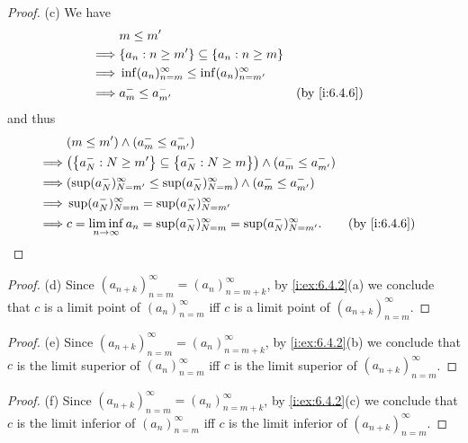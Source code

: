 \begin{proof}{(c)}
  We have
  \begin{align*}
             & m \leq m'                                                                 \\
    \implies & \set{a_n : n \geq m'} \subseteq \set{a_n : n \geq m}                      \\
    \implies & \inf(a_n)_{n = m}^\infty \leq \inf(a_n)_{n = m'}^\infty                   \\
    \implies & a_m^- \leq a_{m'}^-                                     &  & \by{i:6.4.6}
  \end{align*}
  and thus
  \begin{align*}
             & (m \leq m') \land (a_m^- \leq a_{m'}^-)                                                                          \\
    \implies & \big(\set{a_N^- : N \geq m'} \subseteq \set{a_N^- : N \geq m}\big) \land (a_m^- \leq a_{m'}^-)                   \\
    \implies & (\sup(a_N^-)_{N = m'}^\infty \leq \sup(a_N^-)_{N = m}^\infty) \land (a_m^- \leq a_{m'}^-)                        \\
    \implies & \sup(a_N^-)_{N = m}^\infty = \sup(a_N^-)_{N = m'}^\infty                                                         \\
    \implies & c = \liminf_{n \to \infty} a_n = \sup(a_N^-)_{N = m}^\infty = \sup(a_N^-)_{N = m'}^\infty.     &  & \by{i:6.4.6}
  \end{align*}
\end{proof}

\begin{proof}{(d)}
  Since \((a_{n + k})_{n = m}^\infty = (a_n)_{n = m + k}^\infty\), by \cref{i:ex:6.4.2}(a) we conclude that \(c\) is a limit point of \((a_n)_{n = m}^\infty\) iff \(c\) is a limit point of \((a_{n + k})_{n = m}^\infty\).
\end{proof}

\begin{proof}{(e)}
  Since \((a_{n + k})_{n = m}^\infty = (a_n)_{n = m + k}^\infty\), by \cref{i:ex:6.4.2}(b) we conclude that \(c\) is the limit superior of \((a_n)_{n = m}^\infty\) iff \(c\) is the limit superior of \((a_{n + k})_{n = m}^\infty\).
\end{proof}

\begin{proof}{(f)}
  Since \((a_{n + k})_{n = m}^\infty = (a_n)_{n = m + k}^\infty\), by \cref{i:ex:6.4.2}(c) we conclude that \(c\) is the limit inferior of \((a_n)_{n = m}^\infty\) iff \(c\) is the limit inferior of \((a_{n + k})_{n = m}^\infty\).
\end{proof}

